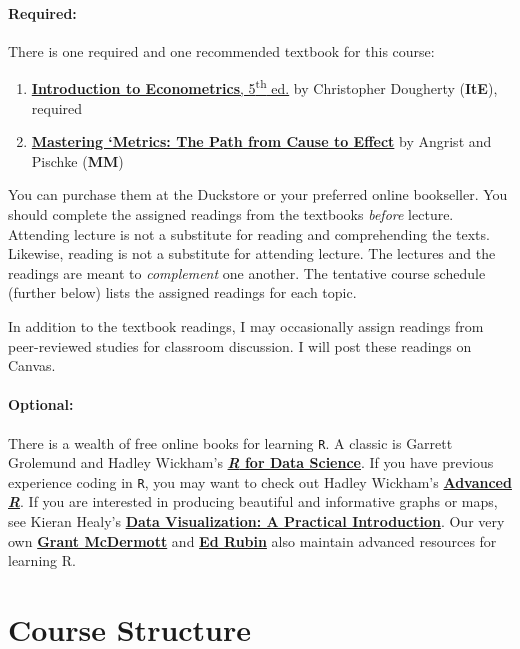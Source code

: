 \documentclass[10pt]{article}
\begin{document}
\paragraph{Required:} There is one required and one recommended textbook for this course:

\begin{enumerate}
	\item \href{http://www.amazon.com/Introduction-Econometrics-Christopher-Dougherty/dp/0199676828/}{\textbf{Introduction to Econometrics}, 5\textsuperscript{th} ed.} by Christopher Dougherty (\textbf{ItE}), required
	\item \href{https://www.amazon.com/Mastering-Metrics-Path-Cause-Effect/dp/0691152845/}{\textbf{Mastering `Metrics: The Path from Cause to Effect}} by Angrist and Pischke (\textbf{MM})
\end{enumerate}
You can purchase them at the Duckstore or your preferred online bookseller. You should complete the assigned readings from the textbooks \textit{before} lecture. Attending lecture is not a substitute for reading and comprehending the texts. Likewise, reading is not a substitute for attending lecture. The lectures and the readings are meant to \textit{complement} one another. The tentative course schedule (further below) lists the assigned readings for each topic.

In addition to the textbook readings, I may occasionally assign readings from peer-reviewed studies for classroom discussion. I will post these readings on Canvas.

\paragraph{Optional:} 
There is a wealth of free online books for learning \texttt{R}. 
A classic is Garrett Grolemund and Hadley Wickham's \href{http://r4ds.had.co.nz}{\textbf{\textit{R} for Data Science}}. 
If you have previous experience coding in \texttt{R}, you may want to check out Hadley Wickham's \href{http://adv-r.had.co.nz/}{\textbf{Advanced \textit{R}}}. 
If you are interested in producing beautiful and informative graphs or maps, see Kieran Healy's \href{http://socviz.co/}{\textbf{Data Visualization: A Practical Introduction}}. 
Our very own \href{https://grantmcdermott.com/teaching/}{\textbf{Grant McDermott}} and \href{http://edrub.in/teaching.html}{\textbf{Ed Rubin}} also maintain advanced resources for learning R.

\newpage
\section*{Course Structure}
\end{document}
